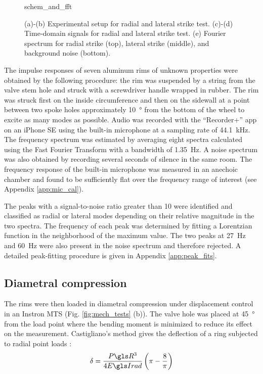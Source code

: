 \documentclass[../thesis.tex]{subfiles}
\begin{document}
\begin{figure}
  \centering
  {schem_and_fft}
  \caption{(a)-(b) Experimental setup for radial and lateral strike test. (c)-(d) Time-domain signals for radial and lateral strike test. (e) Fourier spectrum for radial strike (top), lateral strike (middle), and background noise (bottom).}
  \label{fig:schem}
\end{figure}

The impulse responses of seven aluminum rims of unknown properties were obtained by the following procedure: the rim was suspended by a string from the valve stem hole and struck with a screwdriver handle wrapped in rubber. The rim was struck first on the inside circumference and then on the sidewall at a point between two spoke holes approximately \SI{10}{\degree} from the bottom of the wheel to excite as many modes as possible. Audio was recorded with the ``Recorder+'' app on an iPhone SE using the built-in microphone at a sampling rate of \SI{44.1}{kHz}. The frequency spectrum was estimated by averaging eight spectra calculated using the Fast Fourier Transform with a bandwidth of \SI{1.35}{Hz}. A noise spectrum was also obtained by recording several seconds of silence in the same room. The frequency response of the built-in microphone was measured in an anechoic chamber and found to be sufficiently flat over the frequency range of interest (see Appendix \ref{app:mic_cal}).

The peaks with a signal-to-noise ratio greater than 10 were identified and classified as radial or lateral modes depending on their relative magnitude in the two spectra. The frequency of each peak was determined by fitting a Lorentzian function in the neighborhood of the maximum value. The two peaks at \SI{27}{Hz} and \SI{60}{Hz} were also present in the noise spectrum and therefore rejected. A detailed peak-fitting procedure is given in Appendix \ref{app:peak_fits}.

\subsection{Diametral compression}
The rims were then loaded in diametral compression under displacement control in an Instron MTS (Fig. \ref{fig:mech_tests} (b)). The valve hole was placed at \SI{45}{\degree} from the load point where the bending moment is minimized to reduce its effect on the measurement. Castigliano's method gives the deflection of a ring subjected to radial point loads \cite{Timoshenko1961}:
\begin{equation}\label{eq:def_rad}
\delta = \frac{P\R^3}{4\EIr} \left(\pi-\frac{8}{\pi} \right)
\end{equation}
\end{document}
